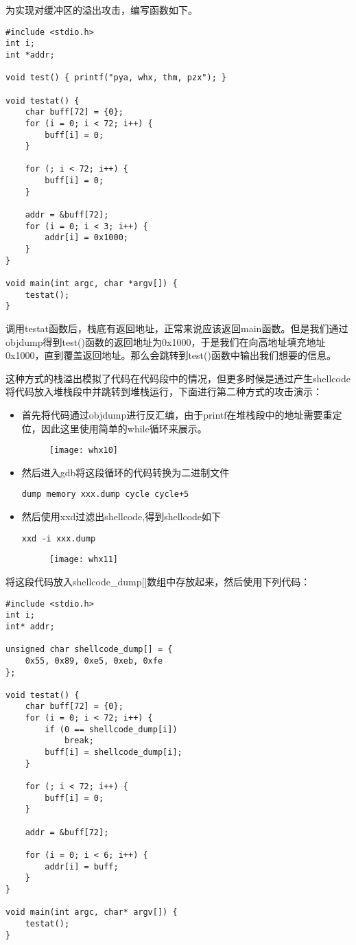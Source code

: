 \documentclass{whureport}
\begin{document}
为实现对缓冲区的溢出攻击，编写函数如下。
\begin{lstlisting}
#include <stdio.h>
int i;
int *addr;

void test() { printf("pya, whx, thm, pzx"); }

void testat() {
	char buff[72] = {0};
	for (i = 0; i < 72; i++) {
    	buff[i] = 0;
	}

	for (; i < 72; i++) {
		buff[i] = 0;
	}

	addr = &buff[72];
	for (i = 0; i < 3; i++) {
		addr[i] = 0x1000;
	}
}

void main(int argc, char *argv[]) {
	testat();
}
\end{lstlisting}

调用testat函数后，栈底有返回地址，正常来说应该返回main函数。但是我们通过objdump得到test()函数的返回地址为0x1000，于是我们在向高地址填充地址0x1000，直到覆盖返回地址。那么会跳转到test()函数中输出我们想要的信息。

这种方式的栈溢出模拟了代码在代码段中的情况，但更多时候是通过产生shellcode将代码放入堆栈段中并跳转到堆栈运行，下面进行第二种方式的攻击演示：

\begin{itemize}
	\item 首先将代码通过objdump进行反汇编，由于printf在堆栈段中的地址需要重定位，因此这里使用简单的while循环来展示。
	\begin{figure}[H]
		\centering
		\texttt{[image: whx10]}
	\end{figure}
	\item 然后进入gdb将这段循环的代码转换为二进制文件
	\begin{lstlisting}
dump memory xxx.dump cycle cycle+5
	\end{lstlisting}
	\item 然后使用xxd过滤出shellcode,得到shellcode如下
	\begin{lstlisting}
xxd -i xxx.dump
	\end{lstlisting}
	\begin{figure}[H]
		\centering
		\texttt{[image: whx11]}
	\end{figure}
\end{itemize}


将这段代码放入shellcode\_dump[]数组中存放起来，然后使用下列代码：

\begin{lstlisting}
#include <stdio.h>
int i;
int* addr;

unsigned char shellcode_dump[] = {
    0x55, 0x89, 0xe5, 0xeb, 0xfe
};

void testat() {
	char buff[72] = {0};
	for (i = 0; i < 72; i++) {
		if (0 == shellcode_dump[i])
			break;
		buff[i] = shellcode_dump[i];
	}

	for (; i < 72; i++) {
		buff[i] = 0;
	}

	addr = &buff[72];

	for (i = 0; i < 6; i++) {
		addr[i] = buff;
	}
}

void main(int argc, char* argv[]) {
	testat();
}
\end{lstlisting}
\end{document}
